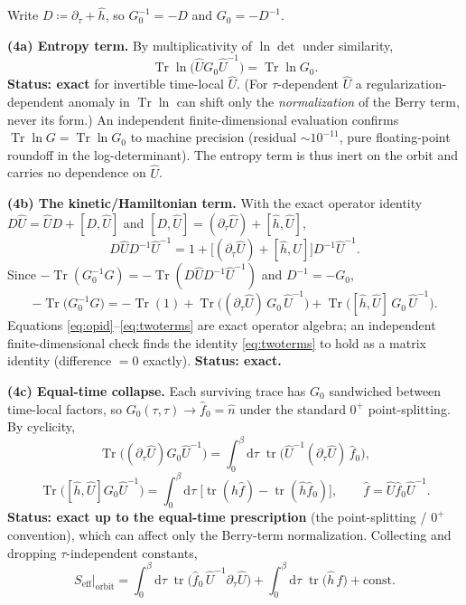 \documentclass[11pt]{article}
\theoremstyle{remark}
\begin{document}
Write $D\coloneqq\partial_\tau+\hat h$, so $G_0^{-1}=-D$ and $G_0=-D^{-1}$.

\medskip
\noindent\textbf{(4a) Entropy term.} By multiplicativity of $\ln\det$ under similarity,
\[
\operatorname{Tr}\ln\!\big(\hat U G_0\hat U^{-1}\big)=\operatorname{Tr}\ln G_0 .
\]
\textbf{Status: exact} for invertible time-local $\hat U$. (For $\tau$-dependent $\hat U$
a regularization-dependent anomaly in $\operatorname{Tr}\ln$ can shift only the \emph{normalization}
of the Berry term, never its form.) An independent finite-dimensional evaluation confirms
$\operatorname{Tr}\ln G=\operatorname{Tr}\ln G_0$ to machine precision (residual $\sim10^{-11}$,
pure floating-point roundoff in the log-determinant). The entropy term is thus inert on
the orbit and carries no dependence on $\hat U$.

\medskip
\noindent\textbf{(4b) The kinetic/Hamiltonian term.} With the exact operator identity
$D\hat U=\hat U D+[D,\hat U]$ and $[D,\hat U]=(\partial_\tau\hat U)+[\hat h,\hat U]$,
\begin{equation}
\label{eq:opid}
D\hat U D^{-1}\hat U^{-1}=1+\big[(\partial_\tau\hat U)+[\hat h,\hat U]\big]D^{-1}\hat U^{-1}.
\end{equation}
Since $-\operatorname{Tr}(G_0^{-1}G)=-\operatorname{Tr}(D\hat U D^{-1}\hat U^{-1})$ and $D^{-1}=-G_0$,
\begin{equation}
\label{eq:twoterms}
-\operatorname{Tr}\!\big(G_0^{-1}G\big)
=-\operatorname{Tr}(1)
+\operatorname{Tr}\!\big((\partial_\tau\hat U)\,G_0\,\hat U^{-1}\big)
+\operatorname{Tr}\!\big([\hat h,\hat U]\,G_0\,\hat U^{-1}\big).
\end{equation}
Equations \eqref{eq:opid}--\eqref{eq:twoterms} are exact operator algebra; an independent
finite-dimensional check finds the identity \eqref{eq:twoterms} to hold as a matrix
identity (difference $=0$ exactly). \textbf{Status: exact.}

\medskip
\noindent\textbf{(4c) Equal-time collapse.} Each surviving trace has $G_0$ sandwiched
between time-local factors, so $G_0(\tau,\tau)\to\hat f_0=\hat n$ under the standard $0^+$
point-splitting. By cyclicity,
\[
\operatorname{Tr}\!\big((\partial_\tau\hat U)G_0\hat U^{-1}\big)
=\int_0^\beta\!\mathrm{d}\tau\;\operatorname{tr}\!\big(\hat U^{-1}(\partial_\tau\hat U)\,\hat f_0\big),
\]
\[
\operatorname{Tr}\!\big([\hat h,\hat U]G_0\hat U^{-1}\big)
=\int_0^\beta\!\mathrm{d}\tau\;\big[\operatorname{tr}(\hat h\hat f)-\operatorname{tr}(\hat h\hat f_0)\big],
\qquad \hat f=\hat U\hat f_0\hat U^{-1}.
\]
\textbf{Status: exact up to the equal-time prescription} (the point-splitting / $0^+$
convention), which can affect only the Berry-term normalization. Collecting and dropping
$\tau$-independent constants,
\begin{equation}
\label{eq:Sorbit}
S_{\mathrm{eff}}\big|_{\text{orbit}}
=\int_0^\beta\!\mathrm{d}\tau\;\operatorname{tr}\!\big(\hat f_0\,\hat U^{-1}\partial_\tau\hat U\big)
+\int_0^\beta\!\mathrm{d}\tau\;\operatorname{tr}\!\big(\hat h\,\hat f\big)+\text{const}.
\end{equation}
\end{document}
